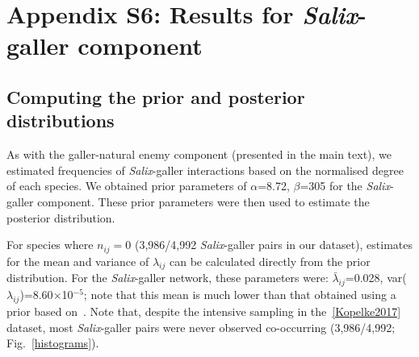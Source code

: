 \documentclass[12pt]{article}
\begin{document}
\clearpage

\section*{Appendix S6: Results for \emph{Salix}-galler component}

    \subsection*{Computing the prior and posterior distributions}

      As with the galler-natural enemy component (presented in the main text), we estimated frequencies of \emph{Salix}-galler interactions based on the normalised degree of each species. We obtained prior parameters of $\alpha$=8.72, $\beta$=305 for the \emph{Salix}-galler component. These prior parameters were then used to estimate the posterior distribution. 


      For species where $n_{ij}=0$ (3,986/4,992 \emph{Salix}-galler pairs in our dataset), estimates for the mean and variance of $\lambda_{ij}$ can be calculated directly from the prior distribution. For the \emph{Salix}-galler network, these parameters were: $\bar\lambda_{ij}$=0.028, var($\lambda_{ij}$)=8.60$\times$10$^{-5}$; note that this mean is much lower than that obtained using a prior based on~\citet[Data available from the Dryad Digital Repository: https://doi.org/10.5061/dryad.g7805]{Barbour2016}. Note that, despite the intensive sampling in the~\ref{Kopelke2017} dataset, most \emph{Salix}-galler pairs were never observed co-occurring (3,986/4,992; Fig.~\ref{histograms}).
\end{document}
